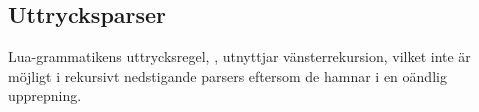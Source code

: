 %

%
%
%
%
%
%
%
%


\subsection{Uttrycksparser}

Lua-grammatikens uttrycksregel, , utnyttjar vänsterrekursion,
vilket inte är möjligt i rekursivt nedstigande parsers eftersom de hamnar i en
oändlig upprepning.

